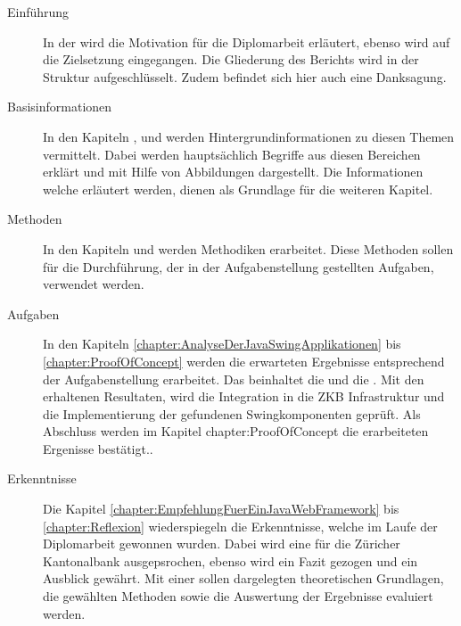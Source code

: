   \begin{description}
    
  \item[Einführung]
  
  In der  wird die Motivation für die Diplomarbeit
  erläutert, ebenso wird auf die Zielsetzung eingegangen. Die Gliederung des
  Berichts wird in der Struktur aufgeschlüsselt. Zudem befindet sich hier auch
  eine Danksagung.
  
  \item[Basisinformationen]
    
  In den Kapiteln 
  , 
   und
   werden
  Hintergrundinformationen zu diesen Themen vermittelt. Dabei werden
  hauptsächlich Begriffe aus diesen Bereichen erklärt und mit Hilfe von
  Abbildungen dargestellt. Die Informationen welche erläutert werden, dienen
  als Grundlage für die weiteren Kapitel.

  \item[Methoden]
  
  In den Kapiteln 
  und  werden
  Methodiken erarbeitet. Diese Methoden sollen für die Durchführung, der in der
  Aufgabenstellung gestellten Aufgaben, verwendet werden.
  
  \item[Aufgaben]
  
  In den Kapiteln \ref{chapter:AnalyseDerJavaSwingApplikationen} bis
  \ref{chapter:ProofOfConcept} werden die erwarteten Ergebnisse
  entsprechend der Aufgabenstellung erarbeitet. Das beinhaltet die
   und die
  . Mit den erhaltenen
  Resultaten, wird die Integration in die ZKB Infrastruktur und die
  Implementierung der gefundenen Swingkomponenten geprüft. Als Abschluss werden
  im Kapitel \refname{chapter:ProofOfConcept} die erarbeiteten Ergenisse
  bestätigt..
  
  \item[Erkenntnisse]
  
  Die Kapitel \ref{chapter:EmpfehlungFuerEinJavaWebFramework} bis
  \ref{chapter:Reflexion} wiederspiegeln die Erkenntnisse, welche im Laufe
  der Diplomarbeit gewonnen wurden. Dabei wird eine
   für die Züricher
  Kantonalbank ausgepsrochen, ebenso wird ein Fazit gezogen und ein Ausblick
  gewährt. Mit einer  sollen dargelegten
  theoretischen Grundlagen, die gewählten Methoden sowie die Auswertung der
  Ergebnisse evaluiert werden.
  

\end{description}
